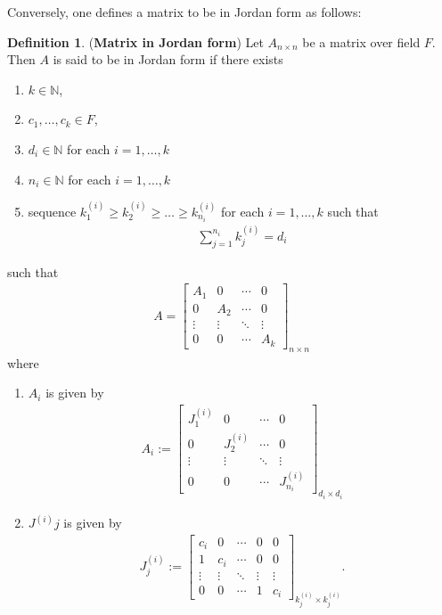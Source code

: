 \documentclass[letterpaper,11pt,twoside]{article}
\theoremstyle{definition}
\theoremstyle{definition}
\newtheorem{definition}[proposition]{Definition}
\theoremstyle{definition}
\theoremstyle{definition}
\theoremstyle{definition}
\theoremstyle{definition}
\theoremstyle{remark}
\theoremstyle{definition}
\newcommand{\N}[0]{\mathbb{N}}
\begin{document}
Conversely, one defines a matrix to be in Jordan form as follows:
\begin{definition}
	(\textbf{Matrix in Jordan form}) Let $ A_{n\times n} $ be a matrix over field $ F $. Then $ A $ is said to be in Jordan form if there exists
	\begin{enumerate}
		\item {$ k \in \N$,}
		\item {$ c_1,\dots,c_k \in F $,}
		\item {$ d_i \in \N $ for each $ i=1,\dots,k $}
		\item {$ n_i\in \N $ for each $ i=1,\dots,k $}
		\item {sequence $ k^{(i)}_{1} \ge k^{(i)}_{2}\ge \dots\ge k^{(i)}_{n_i}$ for each $ i=1,\dots,k $ such that
	\begin{align*}
		\sum_{j=1}^{n_i}k^{(i)}_{j} = d_i
	\end{align*}	
	}
	\end{enumerate}
	such that
	\begin{align*}
		A = \begin{bmatrix}
			A_1&0&\cdots&0\\
			0&A_2&\cdots&0\\
			\vdots&\vdots&\ddots&\vdots\\
			0&0&\cdots&A_k
		\end{bmatrix}_{n\times n}
	\end{align*}
	where
	\begin{enumerate}
		\item { $ A_i $ is given by
			\begin{align*}
				A_i:= \begin{bmatrix}
					J^{(i)}_{1} &0&\cdots&0\\
					0&J^{(i)}_{2}&\cdots&0\\
					\vdots&\vdots&\ddots&\vdots\\
					0&0&\cdots&J^{(i)}_{n_i}
				\end{bmatrix}_{d_i\times d_i}
		\end{align*}}
	\item {$ J^{(i)}{j} $ is given by
\begin{align*}
	J^{(i)}_{j} := \begin{bmatrix}
		c_i &0&\cdots&0&0\\
		1&c_i&\cdots&0&0\\
		\vdots&\vdots&\ddots&\vdots&\vdots\\
		0&0&\cdots&1&c_i
	\end{bmatrix}_{k^{(i)}_{j}\times k^{(i)}_{j}}.
\end{align*}	

}
	\end{enumerate}
\end{definition}
\end{document}
